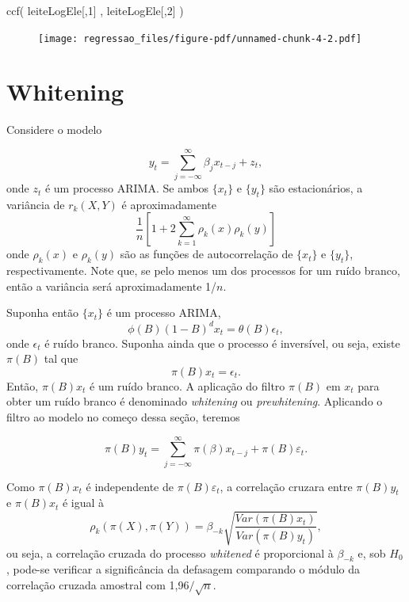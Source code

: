 \documentclass[
  letterpaper,
  DIV=11,
  numbers=noendperiod]{scrartcl}
\newenvironment{Shaded}{\begin{snugshade}}{\end{snugshade}}
\newcommand{\DecValTok}[1]{\textcolor[rgb]{0.68,0.00,0.00}{#1}}
\newcommand{\FunctionTok}[1]{\textcolor[rgb]{0.28,0.35,0.67}{#1}}
\newcommand{\NormalTok}[1]{\textcolor[rgb]{0.00,0.23,0.31}{#1}}
\theoremstyle{plain}
\theoremstyle{plain}
\theoremstyle{definition}
\theoremstyle{definition}
\theoremstyle{remark}
\begin{document}
\begin{Shaded}
\begin{Highlighting}[]
\FunctionTok{ccf}\NormalTok{( leiteLogEle[,}\DecValTok{1}\NormalTok{] , leiteLogEle[,}\DecValTok{2}\NormalTok{] ) }
\end{Highlighting}
\end{Shaded}

\begin{figure}[H]

{\centering \texttt{[image: regressao\_files/figure-pdf/unnamed-chunk-4-2.pdf]}

}

\end{figure}

\hypertarget{whitening}{%
\section{Whitening}\label{whitening}}

Considere o modelo

\[y_t= \sum_{j=-\infty}^\infty \beta_j x_{t-j}+z_t,\] onde \(z_t\) é um
processo ARIMA. Se ambos \(\{x_t\}\) e \(\{y_t\}\) são estacionários, a
variância de \(r_k(X,Y)\) é aproximadamente
\[\frac{1}{n}\left[1+2\sum_{k=1}^\infty \rho_k(x)\rho_k(y)\right]\] onde
\(\rho_k(x)\) e \(\rho_k(y)\) são as funções de autocorrelação de
\(\{x_t\}\) e \(\{y_t\}\), respectivamente. Note que, se pelo menos um
dos processos for um ruído branco, então a variância será
aproximadamente 1/\(n\).

Suponha então \(\{x_t\}\) é um processo ARIMA,
\[\phi(B)(1-B)^d x_t=\theta(B)\epsilon_t,\] onde \(\epsilon_t\) é ruído
branco. Suponha ainda que o processo é inversível, ou seja, existe
\(\pi(B)\) tal que \[\pi(B)x_t=\epsilon_t.\] Então, \(\pi(B)x_t\) é um
ruído branco. A aplicação do filtro \(\pi(B)\) em \(x_t\) para obter um
ruído branco é denominado \emph{whitening} ou \emph{prewhitening}.
Aplicando o filtro ao modelo no começo dessa seção, teremos

\[\pi(B)y_t= \sum_{j=-\infty}^\infty \pi(\beta)x_{t-j}+\pi(B)\varepsilon_t.\]

Como \(\pi(B)x_t\) é independente de \(\pi(B)\varepsilon_t\), a
correlação cruzara entre \(\pi(B)y_t\) e \(\pi(B)x_t\) é igual à
\[\rho_k(\pi(X),\pi(Y))=\beta_{-k}\sqrt{\frac{Var(\pi(B)x_t)}{Var(\pi(B)y_t)}},\]
ou seja, a correlação cruzada do processo \emph{whitened} é proporcional
à \(\beta_{-k}\) e, sob \(H_0\), pode-se verificar a significância da
defasagem comparando o módulo da correlação cruzada amostral com
1,96\(/\sqrt{n}\).
\end{document}
